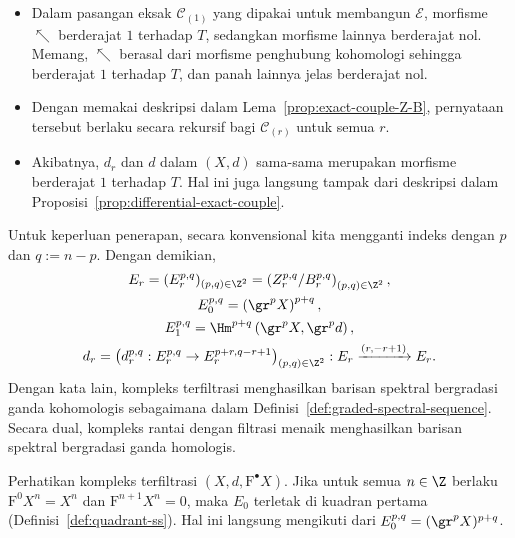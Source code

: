\begin{itemize}
	\item Dalam pasangan eksak $\mathscr{C}_{(1)}$ yang dipakai untuk membangun
	$\mathscr{E}$, morfisme $\nwarrow$ berderajat $1$ terhadap $T$, sedangkan
	morfisme lainnya berderajat nol. Memang, $\nwarrow$ berasal dari morfisme
	penghubung kohomologi sehingga berderajat $1$ terhadap $T$, dan panah
	lainnya jelas berderajat nol.
	\item Dengan memakai deskripsi dalam Lema~\ref{prop:exact-couple-Z-B},
	pernyataan tersebut berlaku secara rekursif bagi $\mathscr{C}_{(r)}$ untuk
	semua $r$.
	\item Akibatnya, $d_r$ dan $d$ dalam $(X,d)$ sama-sama merupakan morfisme
	berderajat $1$ terhadap $T$. Hal ini juga langsung tampak dari deskripsi
	dalam Proposisi~\ref{prop:differential-exact-couple}.
\end{itemize}

Untuk keperluan penerapan, secara konvensional kita mengganti indeks dengan $p$
dan $q:=n-p$. Dengan demikian,
\begin{gather*}
	E_r=(E_r^{p,q})_{(p,q)\in\Z^2}
	=\left(Z_r^{p,q}/B_r^{p,q}\right)_{(p,q)\in\Z^2}, \\
	E_0^{p,q}=\left(\gr^pX\right)^{p+q}, \\
	E_1^{p,q}=\Hm^{p+q}\left(\gr^pX,\gr^pd\right), \\
	d_r=\left(d_r^{p,q}:E_r^{p,q}\to E_r^{p+r,q-r+1}\right)_{(p,q)\in\Z^2}
	:E_r\xrightarrow{(r,-r+1)}E_r.
\end{gather*}
Dengan kata lain, kompleks terfiltrasi menghasilkan barisan spektral
bergradasi ganda kohomologis sebagaimana dalam
Definisi~\ref{def:graded-spectral-sequence}. Secara dual, kompleks rantai
dengan filtrasi menaik menghasilkan barisan spektral bergradasi ganda
homologis.

\begin{example}\label{eg:canonically-bdd-ss}
	Perhatikan kompleks terfiltrasi $(X,d,\mathrm{F}^\bullet X)$. Jika untuk
	semua $n\in\Z$ berlaku $\mathrm{F}^0X^n=X^n$ dan
	$\mathrm{F}^{n+1}X^n=0$, maka $E_0$ terletak di kuadran pertama
	(Definisi~\ref{def:quadrant-ss}). Hal ini langsung mengikuti dari
	$E_0^{p,q}=(\gr^pX)^{p+q}$.
\end{example}


